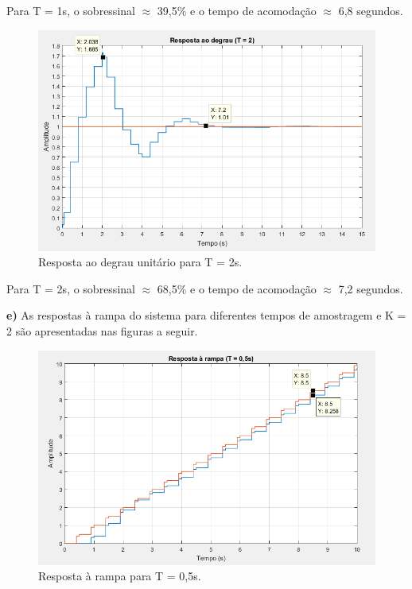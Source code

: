 \documentclass{article}
\begin{document}
    {Para T = 1s, o sobressinal $\approx$ 39,5\% e o tempo de acomodação $\approx$ 6,8 segundos.}

    \vspace{7mm}
    \begin{figure}[H]
       \centering
            \includegraphics[width=1\linewidth]{images/rDeg2.png}
            \caption{Resposta ao degrau unitário para T = 2s.}
            \label{fig:rDeg2}
    \end{figure}

    {Para T = 2s, o sobressinal $\approx$ 68,5\% e o tempo de acomodação $\approx$ 7,2 segundos.}

    \vspace{14mm}
    {\textbf{e)} As respostas à rampa do sistema para diferentes tempos de amostragem e K = 2 são apresentadas nas figuras a seguir.}

    \begin{figure}[H]
       \centering
            \includegraphics[width=1\linewidth]{images/rRamp05.png}
            \caption{Resposta à rampa para T = 0,5s.}
            \label{fig:rRamp05}
    \end{figure}
\end{document}
